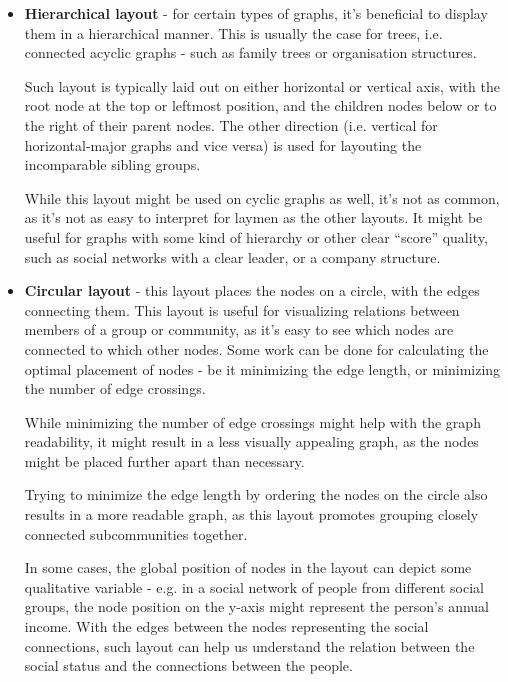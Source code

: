 \begin{itemize}
    \item \textbf{Hierarchical layout} - for certain types of graphs, it's beneficial to display them in a hierarchical manner. 
    This is usually the case for trees, i.e. connected acyclic graphs - such as family trees or organisation structures.

    Such layout is typically laid out on either horizontal or vertical axis, with the root node at the top or leftmost position, and the children nodes below or to the right of their parent nodes.
    The other direction (i.e. vertical for horizontal-major graphs and vice versa) is used for layouting the incomparable sibling groups.
    
    While this layout might be used on cyclic graphs as well, it's not as common, as it's not as easy to interpret for laymen as the other layouts.
    It might be useful for graphs with some kind of hierarchy or other clear ``score'' quality, such as social networks with a clear leader, or a company structure.

    \item \textbf{Circular layout} - this layout places the nodes on a circle, with the edges connecting them. 
    This layout is useful for visualizing relations between members of a group or community, as it's easy to see which nodes are connected to which other nodes.
    Some work can be done for calculating the optimal placement of nodes - be it minimizing the edge length, or minimizing the number of edge crossings.

    While minimizing the number of edge crossings might help with the graph readability, it might result in a less visually appealing graph, as the nodes might be placed further apart than necessary.

    Trying to minimize the edge length by ordering the nodes on the circle also results in a more readable graph, as this layout promotes grouping closely connected subcommunities together.

    In some cases, the global position of nodes in the layout can depict some qualitative variable - e.g. in a social network of people from different social groups, 
    the node position on the y-axis might represent the person's annual income. With the edges between the nodes representing the social connections,
    such layout can help us understand the relation between the social status and the connections between the people.


\end{itemize}
